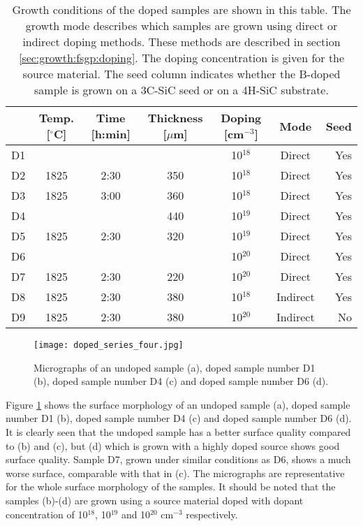 \begin{table}[h]
\caption{Growth conditions of the doped samples are shown in this table. The growth mode describes which samples are grown using direct or indirect doping methods. These methods are described in section \ref{sec:growth:fsgp:doping}. The doping concentration is given for the source material. The seed column indicates whether the B-doped sample is grown on a 3C-SiC seed or on a 4H-SiC substrate.} 
\label{tab:doped_samples}
\begin{center}
\begin{tabular}{l c c c c c r}
  \hline                       
  \hline       
  \vspace{1mm}
   & \small{Temp. [$^\circ$C]} & \small{Time [h:min]} & \small{Thickness [$\mu$m]} & \small{Doping [cm$^{-3}$]} & Mode & Seed\\
    \hline
  D1 &  &  &  & 10$^{18}$&Direct & Yes\\ %
  D2 & 1825 & 2:30 & 350 & 10$^{18}$&Direct & Yes\\ %
  D3 & 1825 & 3:00 & 360 & 10$^{18}$&Direct & Yes\\	%
  D4 &  &  & 440 & 10$^{19}$&Direct & Yes\\ %
  D5 & 1825 & 2:30 & 320 & 10$^{19}$&Direct & Yes\\ %
  D6 &  &  &  & 10$^{20}$&Direct & Yes\\%
  D7 & 1825 & 2:30 & 220 & 10$^{20}$&Direct & Yes\\%
  D8 & 1825 & 2:30 & 380 & 10$^{18}$&Indirect & Yes\\%
  D9 & 1825 & 2:30 & 380 & 10$^{20}$&Indirect & No\\%
  
  \hline  
\end{tabular}
\end{center}
\end{table}


\begin{figure}[h]
\begin{center}
\texttt{[image: doped\_series\_four.jpg]}
\caption{Micrographs of an undoped sample (a), doped sample number D1 (b), doped sample number D4 (c) and doped sample number D6 (d).
\label{fig:B_doped_micrographs1}}
\end{center}
\end{figure}

Figure \ref{fig:B_doped_micrographs1} shows the surface morphology of an undoped sample (a), doped sample number D1 (b), doped sample number D4 (c) and doped sample number D6 (d). It is clearly seen that the undoped sample has a better surface quality compared to (b) and (c), but (d) which is grown with a highly doped source shows good surface quality. Sample D7, grown under similar conditions as D6, shows a much worse surface, comparable with that in (c). The micrographs are representative for the whole surface morphology of the samples. It should be noted that the samples (b)-(d)   are grown using a source material doped with dopant concentration of 10$^{18}$, 10$^{19}$ and 10$^{20}$ cm$^{-3}$ respectively.

